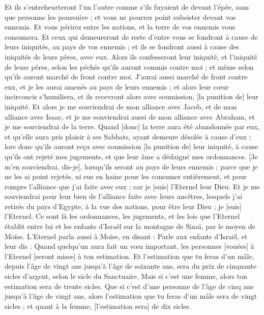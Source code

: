 \begin{multicols}{2}
Et ils s'entreheurteront l'un l'autre comme s'ils fuyaient de devant l'épée, sans que personne les poursuive ; et vous ne pourrez point subsister devant vos ennemis.
Et vous périrez entre les nations, et la terre de vos ennemis vous consumera.
Et ceux qui demeureront de reste d'entre vous se fondront à cause de leurs iniquités, au pays de vos ennemis ; et ils se fondront aussi à cause des iniquités de leurs pères, avec eux.
Alors ils confesseront leur iniquité, et l'iniquité de leurs pères, selon les péchés qu'ils auront commis contre moi ; et même selon qu'ils auront marché de front contre moi.
J'aurai aussi marché de front contre eux, et je les aurai amenés au pays de leurs ennemis ; et alors leur cœur incirconcis s'humiliera, et ils recevront alors avec soumission, [la punition de] leur iniquité.
Et alors je me souviendrai de mon alliance avec Jacob, et de mon alliance avec Isaac, et je me souviendrai aussi de mon alliance avec Abraham, et je me souviendrai de la terre.
Quand [donc] la terre aura été abandonnée par eux, et qu'elle aura pris plaisir à ses Sabbats, ayant demeure désolée à cause d'eux ; lors donc qu'ils auront reçu avec soumission [la punition de] leur iniquité, à cause qu'ils ont rejeté mes jugements, et que leur âme a dédaigné mes ordonnances.
[Je m'en souviendrai, dis-je], lorsqu'ils seront au pays de leurs ennemis ; parce que je ne les ai point rejetés, ni eus en haine pour les consumer entièrement, et pour rompre l'alliance que j'ai faite avec eux ; car je [suis] l'Eternel leur Dieu.
Et je me souviendrai pour leur bien de l'alliance faite avec leurs ancêtres, lesquels j'ai retirés du pays d'Egypte, à la vue des nations, pour être leur Dieu ; je [suis] l'Eternel.
Ce sont là les ordonnances, les jugements, et les lois que l'Eternel établit entre lui et les enfants d'Israël sur la montagne de Sinaï, par le moyen de Moïse.
\VerseOne{}L'Eternel parla aussi à Moïse, en disant :
Parle aux enfants d'Israël, et leur dis : Quand quelqu'un aura fait un vœu important, les personnes [vouées] à l'Eternel [seront mises] à ton estimation.
Et l'estimation que tu feras d'un mâle, depuis l'âge de vingt ans jusqu'à l'âge de soixante ans, sera du prix de cinquante sicles d'argent, selon le sicle du Sanctuaire.
Mais si c'est une femme, alors ton estimation sera de trente sicles.
Que si c'est d'une personne de l'âge de cinq ans jusqu'à l'âge de vingt ans, alors l'estimation que tu feras d'un mâle sera de vingt sicles ; et quant à la femme, [l'estimation sera] de dix sicles.

\end{multicols}
